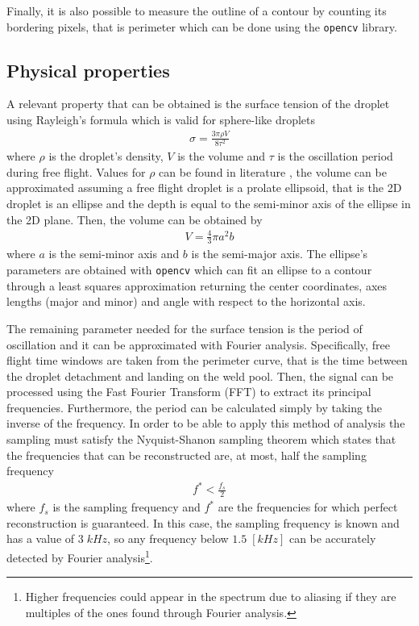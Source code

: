 Finally, it is also possible to measure the outline of a contour by counting its bordering pixels, that is perimeter which can be done using the \texttt{opencv} library.

\subsection{Physical properties}\label{sec:physical}
A relevant property that can be obtained is the surface tension of the droplet using Rayleigh's formula \cite{rayleigh} which is valid for sphere-like droplets
\begin{align}\label{eq:rayleigh}
    \sigma = \frac{3\pi \rho V}{8\tau^2}
\end{align}
where $\rho$ is the droplet's density, $V$ is the volume and $\tau$ is the oscillation period during free flight. Values for $\rho$ can be found in literature \cite{surface_tension}, the volume can be approximated assuming a free flight droplet is a prolate ellipsoid, that is the 2D droplet is an ellipse and the depth is equal to the semi-minor axis of the ellipse in the 2D plane. Then, the volume can be obtained by
\begin{align}\label{eq:vol}
    V=\frac{4}{3}\pi a^2b
\end{align}
where $a$ is the semi-minor axis and $b$ is the semi-major axis. The ellipse's parameters are obtained with \texttt{opencv} which can fit an ellipse to a contour through a least squares approximation returning the center coordinates, axes lengths (major and minor) and angle with respect to the horizontal axis.

The remaining parameter needed for the surface tension is the period of oscillation and it can be approximated with Fourier analysis. Specifically, free flight time windows are taken from the perimeter curve, that is the time between the droplet detachment and landing on the weld pool. Then, the signal can be processed using the Fast Fourier Transform (FFT) to extract its principal frequencies. Furthermore, the period can be calculated simply by taking the inverse of the frequency. In order to be able to apply this method of analysis the sampling must satisfy the Nyquist-Shanon sampling theorem which states that the frequencies that can be reconstructed are, at most, half the sampling frequency \cite{shannon}
\begin{align*}
    f^*<\frac{f_s}{2}
\end{align*}
where $f_s$ is the sampling frequency and $f^*$ are the frequencies for which perfect reconstruction is guaranteed. In this case, the sampling frequency is known and has a value of $3\; kHz$, so any frequency below $1.5\;[kHz]$ can be accurately detected by Fourier analysis\footnote{Higher frequencies could appear in the spectrum due to aliasing if they are multiples of the ones found through Fourier analysis.}.

